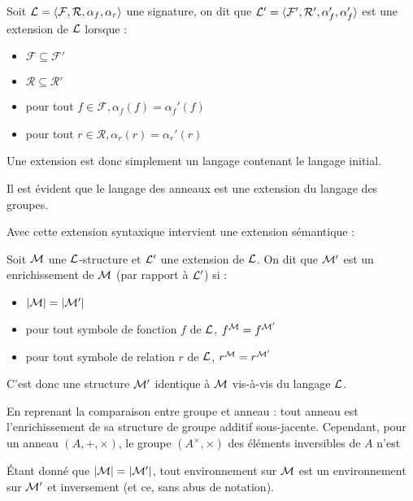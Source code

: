 \begin{defi}
    Soit $\mathcal L = \langle \mathcal F,\mathcal R,\alpha_f,\alpha_r\rangle$ une signature, on dit que $\mathcal L'=\langle \mathcal F',\mathcal R',\alpha_f',\alpha_f'\rangle$ est une extension de $\mathcal L$ lorsque :
    \begin{itemize}[label=$\bullet$]
        \item $\mathcal F \subseteq \mathcal F'$
        \item $\mathcal R \subseteq \mathcal R'$
        \item pour tout $f\in\mathcal F, \alpha_f(f)=\alpha_f'(f)$
        \item pour tout $r\in\mathcal R, \alpha_r(r)=\alpha_r'(r)$
    \end{itemize}
    Une extension est donc simplement un langage contenant le langage initial.
\end{defi}

\begin{expl}
    Il est évident que le langage des anneaux est une extension du langage des groupes.
\end{expl}

Avec cette extension syntaxique intervient une extension sémantique :

\begin{defi}
    Soit $\mathcal M$ une $\mathcal L$-structure et $\mathcal L'$ une extension de $\mathcal L$. On dit que $\mathcal M'$ est un enrichissement de $\mathcal M$ (par rapport à $\mathcal L'$) si :
    \begin{itemize}[label=$\bullet$]
        \item $|\mathcal M|=|\mathcal M'|$
        \item pour tout symbole de fonction $f$ de $\mathcal L$, $f^\mathcal M= f^{\mathcal M'}$
        \item pour tout symbole de relation $r$ de $\mathcal L$, $r^\mathcal M= r^{\mathcal M'}$
    \end{itemize}
    C'est donc une structure $\mathcal M'$ identique à $\mathcal M$ vis-à-vis du langage $\mathcal L$.
\end{defi}

\begin{expl}
    En reprenant la comparaison entre groupe et anneau : tout anneau est l'enrichissement de sa structure de groupe additif sous-jacente. Cependant, pour un anneau $(A,+,\times)$, le groupe $(A^\times,\times)$ des éléments inversibles de $A$ n'est
\end{expl}

\begin{rmk}
    \'Etant donné que $|\mathcal M|=|\mathcal M'|$, tout environnement sur $\mathcal M$ est un environnement sur $\mathcal M'$ et inversement (et ce, sans abus de notation).
\end{rmk}

